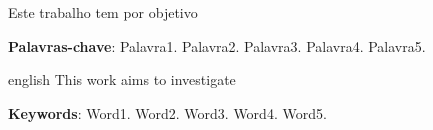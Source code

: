 

\setlength{\absparsep}{18pt} %


\begin{resumo}
Este trabalho tem por objetivo \lipsum[1-1]

\noindent\textbf{Palavras-chave}: Palavra1. Palavra2. Palavra3. Palavra4. Palavra5.
\end{resumo}

\begin{resumo}[Abstract]
 \begin{otherlanguage*}{english}
   This work aims to investigate \lipsum[1-1]

   
\noindent \textbf{Keywords}: Word1. Word2. Word3. Word4. Word5.
 \end{otherlanguage*}
\end{resumo}



